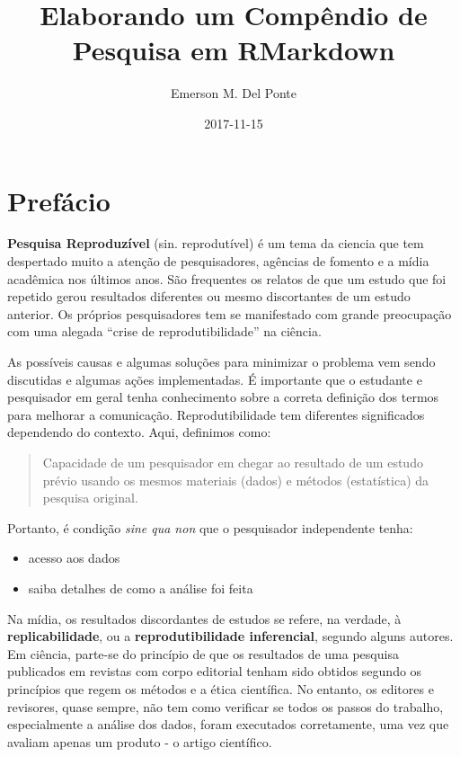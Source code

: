 \documentclass[]{book}
\title{Elaborando um Compêndio de Pesquisa em RMarkdown}
\author{Emerson M. Del Ponte}
\date{2017-11-15}
\providecommand{\tightlist}{%
  \setlength{\itemsep}{0pt}\setlength{\parskip}{0pt}}
\begin{document}
\maketitle

{
\setcounter{tocdepth}{1}
\tableofcontents
}
\hypertarget{prefacio}{%
\chapter*{Prefácio}\label{prefacio}}

\textbf{Pesquisa Reproduzível} (sin. reprodutível) é um tema da ciencia
que tem despertado muito a atenção de pesquisadores, agências de fomento
e a mídia acadêmica nos últimos anos. São frequentes os relatos de que
um estudo que foi repetido gerou resultados diferentes ou mesmo
discortantes de um estudo anterior. Os próprios pesquisadores tem se
manifestado com grande preocupação com uma alegada ``crise de
reprodutibilidade'' na ciência.

As possíveis causas e algumas soluções para minimizar o problema vem
sendo discutidas e algumas ações implementadas. É importante que o
estudante e pesquisador em geral tenha conhecimento sobre a correta
definição dos termos para melhorar a comunicação. Reprodutibilidade tem
diferentes significados dependendo do contexto. Aqui, definimos como:

\begin{quote}
Capacidade de um pesquisador em chegar ao resultado de um estudo prévio
usando os mesmos materiais (dados) e métodos (estatística) da pesquisa
original.
\end{quote}

Portanto, é condição \emph{sine qua non} que o pesquisador independente
tenha:

\begin{itemize}
\tightlist
\item
  acesso aos dados
\item
  saiba detalhes de como a análise foi feita
\end{itemize}

Na mídia, os resultados discordantes de estudos se refere, na verdade, à
\textbf{replicabilidade}, ou a \textbf{reprodutibilidade inferencial},
segundo alguns autores. Em ciência, parte-se do princípio de que os
resultados de uma pesquisa publicados em revistas com corpo editorial
tenham sido obtidos segundo os princípios que regem os métodos e a ética
científica. No entanto, os editores e revisores, quase sempre, não tem
como verificar se todos os passos do trabalho, especialmente a análise
dos dados, foram executados corretamente, uma vez que avaliam apenas um
produto - o artigo científico.
\end{document}
